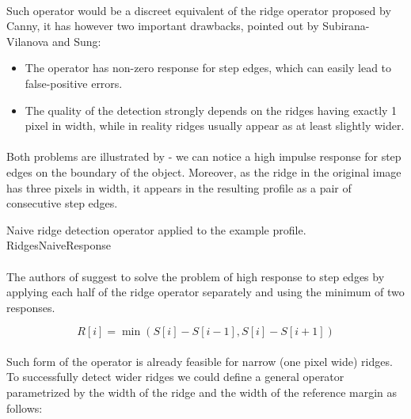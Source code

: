 \paragraph*{}
Such operator would be a discreet equivalent of the ridge operator proposed by Canny\cite{Canny86}, it has however two important drawbacks, pointed out by Subirana-Vilanova and Sung\cite{Subirana-VilanovaSung93}:

\begin{itemize}
	\item The operator has non-zero response for step edges, which can easily lead to false-positive errors.
	\item The quality of the detection strongly depends on the ridges having exactly 1 pixel in width, while in reality ridges usually appear as at least slightly wider.
\end{itemize}

\paragraph*{}
Both problems are illustrated by  - we can notice a high impulse response for step edges on the boundary of the object. Moreover, as the ridge in the original image has three pixels in width, it appears in the resulting profile as a pair of consecutive step edges.

\profileFigure
{
}
{Naive ridge detection operator applied to the example profile.}
{RidgesNaiveResponse}

\paragraph*{}
The authors of \cite{Subirana-VilanovaSung93} suggest to solve the problem of high response to step edges by applying each half of the ridge operator separately and using the minimum of two responses.

\[
	R[i] = \min(S[i]-S[i-1],S[i]-S[i+1])
\]

\paragraph*{}
Such form of the operator is already feasible for narrow (one pixel wide) ridges. To successfully detect wider ridges we could define a general operator parametrized by the width of the ridge and the width of the reference margin as follows:

